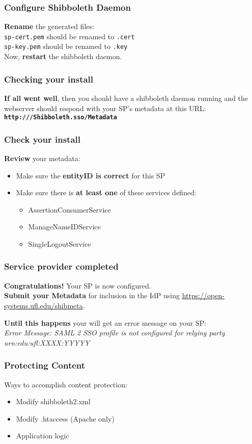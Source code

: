 \begin{frame}
\frametitle{Configure Shibboleth Daemon}
\textbf{Rename} the generated files: \\ \bigskip
\texttt{sp-cert.pem} should be renamed to \texttt{.cert} \\
\bigskip
\texttt{sp-key.pem} should be renamed to \texttt{.key} \\
\bigskip
Now, \textbf{restart} the shibboleth daemon.
\end{frame}

\begin{frame}
\frametitle{Checking your install}
\textbf{If all went well}, then you should have a shibboleth daemon running 
and the webserver should respond with your SP's metadata at this URL: \\ \bigskip
\textbf{\texttt{http:///Shibboleth.sso/Metadata}}
\end{frame}

\begin{frame}
\frametitle{Check your install}
\textbf{Review} your metadata:
\begin{itemize}
\item Make sure the \textbf{entityID is correct} for this SP
\item Make sure there is \textbf{at least one} of these services defined:
\begin{itemize}
\item AssertionConsumerService
\item ManageNameIDService
\item SingleLogoutService
\end{itemize}
\end{itemize}
\end{frame}

\begin{frame}
\frametitle{Service provider completed}
{\large \textbf{Congratulations!} Your SP is now configured.} \\
\bigskip
\textbf{Submit your Metadata} for inclusion in the IdP using \url{https://open-systems.ufl.edu/shibmeta}.

\bigskip \bigskip
\textbf{Until this happens} your will get an error message on your SP: \\ \bigskip
\textit{Error Message: SAML 2 SSO profile is not configured for relying party urn:edu:ufl:XXXX:YYYYY}
\end{frame}

\begin{frame}
\frametitle{Protecting Content}
Ways to accomplish content protection:
\begin{itemize}
\item Modify shibboleth2.xml
\item Modify .htaccess (Apache only)
\item Application logic
\end{itemize}
\end{frame}

